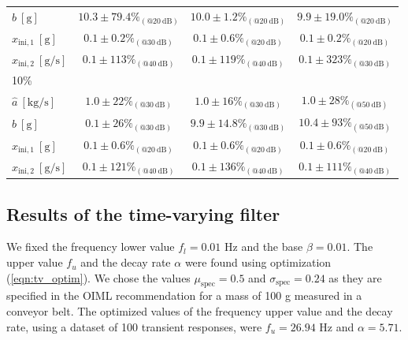{{\begin{table}[h!]
\begin{tabular}{c| c c c}
 \multicolumn{1}{l|}{\hspace{2mm} $\widehat{b} \ \mathrm{[g]}$} & $10.3 \pm 79.4 \%_{(@20 \ \mathrm{dB})}$ & $10.0 \pm 1.2 \%_{(@20 \ \mathrm{dB})}$ & $9.9 \pm 19.0 \%_{(@20 \ \mathrm{dB})}$ \\ 
\multicolumn{1}{l|}{\hspace{2mm} $\widehat{x}_{\mathrm{ini,1}} \ \mathrm{[g]}$} & $0.1 \pm 0.2 \%_{(@30 \ \mathrm{dB})}$ & $0.1 \pm 0.6 \%_{(@20 \ \mathrm{dB})}$ & $0.1 \pm 0.2 \%_{(@20 \ \mathrm{dB})}$ \\
 \multicolumn{1}{l|}{\hspace{2mm} $\widehat{x}_{\mathrm{ini,2}} \ \mathrm{[g/s]}$} & $0.1 \pm 113 \%_{(@40 \ \mathrm{dB})}$ & $0.1 \pm 119 \%_{(@40 \ \mathrm{dB})}$ & $0.1 \pm 323 \%_{(@30 \ \mathrm{dB})}$ \\
 \multicolumn{1}{l|}{10\%} \\
 \multicolumn{1}{l|}{\hspace{2mm} $\widehat{a} \ \mathrm{[kg/s]}$} & $1.0 \pm 22 \%_{(@30 \ \mathrm{dB})}$ & $1.0 \pm 16 \%_{(@30 \ \mathrm{dB})}$ & $1.0 \pm 28 \%_{(@50 \ \mathrm{dB})}$ \\ 
 \multicolumn{1}{l|}{\hspace{2mm} $\widehat{b} \ \mathrm{[g]}$} & $0.1 \pm 26 \%_{(@30 \ \mathrm{dB})}$ & $9.9 \pm 14.8 \%_{(@30 \ \mathrm{dB})}$ & $10.4 \pm 93 \%_{(@50 \ \mathrm{dB})}$ \\ 
\multicolumn{1}{l|}{\hspace{2mm} $\widehat{x}_{\mathrm{ini,1}} \ \mathrm{[g]}$} & $0.1 \pm 0.6 \%_{(@20 \ \mathrm{dB})}$ & $0.1 \pm 0.6 \%_{(@20 \ \mathrm{dB})}$ & $0.1 \pm 0.6 \%_{(@20 \ \mathrm{dB})}$ \\
 \multicolumn{1}{l|}{\hspace{2mm} $\widehat{x}_{\mathrm{ini,2}} \ \mathrm{[g/s]}$} & $0.1 \pm 121 \%_{(@40 \ \mathrm{dB})}$ & $0.1 \pm 136 \%_{(@40 \ \mathrm{dB})}$ & $0.1 \pm 111 \%_{(@40 \ \mathrm{dB})}$ \\  [0.5ex] 
\hline
\end{tabular}

\label{table:ml_sensitivity}
\end{table}




\subsection{Results of the time-varying filter}

We fixed the frequency lower value $f_l=0.01$ Hz and the base $\beta = 0.01$. 
The upper value $f_u$ and the decay rate $\alpha$ were found using optimization (\ref{eqn:tv_optim}). 
We chose the values $\mu_{\mathrm{spec}}=0.5$ and $\sigma_{\mathrm{spec}}=0.24$ as they are specified in the OIML recommendation \citep{OIML_R51_1} for a mass of 100 g measured in a conveyor belt.
The optimized values of the frequency upper value and the decay rate, using a dataset of 100 transient responses, were $f_u = 26.94$ Hz and $\alpha = 5.71$.

}}
